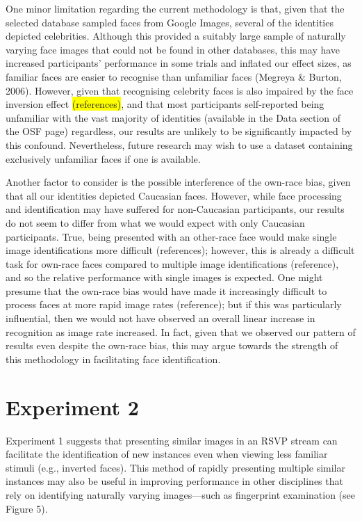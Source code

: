 \documentclass[
  english,
  man]{apa6}
\begin{document}
One minor limitation regarding the current methodology is that, given that the selected database sampled faces from Google Images, several of the identities depicted celebrities. Although this provided a suitably large sample of naturally varying face images that could not be found in other databases, this may have increased participants' performance in some trials and inflated our effect sizes, as familiar faces are easier to recognise than unfamiliar faces (Megreya \& Burton, 2006). However, given that recognising celebrity faces is also impaired by the face inversion effect \colorbox{yellow}{(references)}, and that most participants self-reported being unfamiliar with the vast majority of identities (available in the Data section of the OSF page) regardless, our results are unlikely to be significantly impacted by this confound. Nevertheless, future research may wish to use a dataset containing exclusively unfamiliar faces if one is available.

Another factor to consider is the possible interference of the own-race bias, given that all our identities depicted Caucasian faces. However, while face processing and identification may have suffered for non-Caucasian participants, our results do not seem to differ from what we would expect with only Caucasian participants. True, being presented with an other-race face would make single image identifications more difficult (references); however, this is already a difficult task for own-race faces compared to multiple image identifications (reference), and so the relative performance with single images is expected. One might presume that the own-race bias would have made it increasingly difficult to process faces at more rapid image rates (reference); but if this was particularly influential, then we would not have observed an overall linear increase in recognition as image rate increased. In fact, given that we observed our pattern of results even despite the own-race bias, this may argue towards the strength of this methodology in facilitating face identification.

\hypertarget{experiment-2}{%
\section{Experiment 2}\label{experiment-2}}

Experiment 1 suggests that presenting similar images in an RSVP stream can facilitate the identification of new instances even when viewing less familiar stimuli (e.g., inverted faces). This method of rapidly presenting multiple similar instances may also be useful in improving performance in other disciplines that rely on identifying naturally varying images---such as fingerprint examination (see Figure 5).
\end{document}
